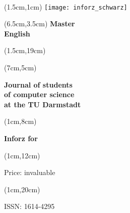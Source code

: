 \begin{titlepage}~


	\begin{textblock*}{12cm}(1.5cm,1cm)
		\texttt{[image: inforz\_schwarz]}
	\end{textblock*}


    \begin{textblock*}{12cm}(6.5cm,3.5cm)
        \centering\fontsize{25}{25}\sffamily\textbf{
            \textcolor{mycolor}{Master } \\
            \textcolor{mycolor}{English}}
    \end{textblock*}


	\begin{textblock*}{12cm}(1.5cm,19cm)
	\end{textblock*}

	\begin{textblock*}{7cm}(7cm,5cm)
		\begin{flushright}
			\large\sffamily\textbf{
				\textcolor{.}{Journal of students}\\
				\textcolor{.}{of computer science\\at the TU Darmstadt}}
		\end{flushright}
	\end{textblock*}



	\begin{textblock*}{5cm}(1cm,8cm)
		\begin{rotate}{90}
			\sffamily\huge\textbf{
				\textcolor{.}{Inforz for \ophase}}
		\end{rotate}
	\end{textblock*}


	\begin{textblock*}{2cm}(1cm,12cm)
		\begin{rotate}{90}
			\sffamily\tiny \textcolor{.}{Price: invaluable}
		\end{rotate}
	\end{textblock*}


	\begin{textblock*}{2cm}(1cm,20cm)
		\begin{rotate}{90}
			\sffamily \textcolor{.}{ISSN: 1614-4295}
		\end{rotate}
	\end{textblock*}
\end{titlepage}
\newpage


